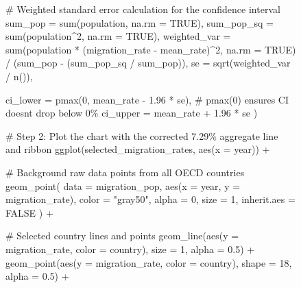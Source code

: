 \documentclass[
  letterpaper,
  DIV=11,
  numbers=noendperiod]{scrartcl}
\newenvironment{Shaded}{\begin{snugshade}}{\end{snugshade}}
\newcommand{\AttributeTok}[1]{\textcolor[rgb]{0.40,0.45,0.13}{#1}}
\newcommand{\CommentTok}[1]{\textcolor[rgb]{0.37,0.37,0.37}{#1}}
\newcommand{\ConstantTok}[1]{\textcolor[rgb]{0.56,0.35,0.01}{#1}}
\newcommand{\DecValTok}[1]{\textcolor[rgb]{0.68,0.00,0.00}{#1}}
\newcommand{\FloatTok}[1]{\textcolor[rgb]{0.68,0.00,0.00}{#1}}
\newcommand{\FunctionTok}[1]{\textcolor[rgb]{0.28,0.35,0.67}{#1}}
\newcommand{\NormalTok}[1]{\textcolor[rgb]{0.00,0.23,0.31}{#1}}
\newcommand{\SpecialCharTok}[1]{\textcolor[rgb]{0.37,0.37,0.37}{#1}}
\newcommand{\StringTok}[1]{\textcolor[rgb]{0.13,0.47,0.30}{#1}}
\begin{document}
\begin{figure}
{\begin{Shaded}
\begin{Highlighting}[]
    \CommentTok{\# Weighted standard error calculation for the confidence interval}
    \AttributeTok{sum\_pop =} \FunctionTok{sum}\NormalTok{(population, }\AttributeTok{na.rm =} \ConstantTok{TRUE}\NormalTok{),}
    \AttributeTok{sum\_pop\_sq =} \FunctionTok{sum}\NormalTok{(population}\SpecialCharTok{\^{}}\DecValTok{2}\NormalTok{, }\AttributeTok{na.rm =} \ConstantTok{TRUE}\NormalTok{),}
    \AttributeTok{weighted\_var =} \FunctionTok{sum}\NormalTok{(population }\SpecialCharTok{*}\NormalTok{ (migration\_rate }\SpecialCharTok{{-}}\NormalTok{ mean\_rate)}\SpecialCharTok{\^{}}\DecValTok{2}\NormalTok{, }\AttributeTok{na.rm =} \ConstantTok{TRUE}\NormalTok{) }\SpecialCharTok{/}\NormalTok{ (sum\_pop }\SpecialCharTok{{-}}\NormalTok{ (sum\_pop\_sq }\SpecialCharTok{/}\NormalTok{ sum\_pop)),}
    \AttributeTok{se =} \FunctionTok{sqrt}\NormalTok{(weighted\_var }\SpecialCharTok{/} \FunctionTok{n}\NormalTok{()),}
    
    \AttributeTok{ci\_lower =} \FunctionTok{pmax}\NormalTok{(}\DecValTok{0}\NormalTok{, mean\_rate }\SpecialCharTok{{-}} \FloatTok{1.96} \SpecialCharTok{*}\NormalTok{ se), }\CommentTok{\# pmax(0) ensures CI doesn\textquotesingle{}t drop below 0\%}
    \AttributeTok{ci\_upper =}\NormalTok{ mean\_rate }\SpecialCharTok{+} \FloatTok{1.96} \SpecialCharTok{*}\NormalTok{ se}
\NormalTok{  )}

\CommentTok{\# Step 2: Plot the chart with the corrected 7.29\% aggregate line and ribbon}
\FunctionTok{ggplot}\NormalTok{(selected\_migration\_rates, }\FunctionTok{aes}\NormalTok{(}\AttributeTok{x =}\NormalTok{ year)) }\SpecialCharTok{+}
  
  \CommentTok{\# Background raw data points from all OECD countries}
  \FunctionTok{geom\_point}\NormalTok{(}
    \AttributeTok{data =}\NormalTok{ migration\_pop,}
    \FunctionTok{aes}\NormalTok{(}\AttributeTok{x =}\NormalTok{ year, }\AttributeTok{y =}\NormalTok{ migration\_rate),}
    \AttributeTok{color =} \StringTok{"gray50"}\NormalTok{,}
    \AttributeTok{alpha =} \DecValTok{0}\NormalTok{,}
    \AttributeTok{size =} \DecValTok{1}\NormalTok{,}
    \AttributeTok{inherit.aes =} \ConstantTok{FALSE}
\NormalTok{  ) }\SpecialCharTok{+}
  
  \CommentTok{\# Selected country lines and points}
  \FunctionTok{geom\_line}\NormalTok{(}\FunctionTok{aes}\NormalTok{(}\AttributeTok{y =}\NormalTok{ migration\_rate, }\AttributeTok{color =}\NormalTok{ country), }\AttributeTok{size =} \DecValTok{1}\NormalTok{, }\AttributeTok{alpha =} \FloatTok{0.5}\NormalTok{) }\SpecialCharTok{+}
  \FunctionTok{geom\_point}\NormalTok{(}\FunctionTok{aes}\NormalTok{(}\AttributeTok{y =}\NormalTok{ migration\_rate, }\AttributeTok{color =}\NormalTok{ country), }\AttributeTok{shape =} \DecValTok{18}\NormalTok{, }\AttributeTok{alpha =} \FloatTok{0.5}\NormalTok{) }\SpecialCharTok{+}
  

\end{Highlighting}
\end{Shaded}}
\end{figure}
\end{document}
